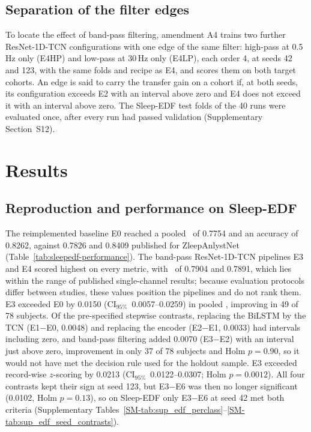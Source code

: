 \documentclass[11pt,a4paper]{article}
\newcommand{\mf}{\text{macro-F1}}
\newcommand{\ci}{\ensuremath{\mathrm{CI}_{95\%}}}
\begin{document}
\subsection{Separation of the filter edges}

To locate the effect of band-pass filtering, amendment A4 trains two further ResNet-1D-TCN
configurations with one edge of the same filter: high-pass at 0.5\,Hz only (E4HP) and low-pass at
30\,Hz only (E4LP), each order 4, at seeds 42 and 123, with the same folds and recipe as E4, and
scores them on both target cohorts. An edge is said to carry the transfer gain on a cohort if, at both
seeds, its configuration exceeds E2 with an interval above zero and E4 does not exceed it with an
interval above zero. The Sleep-EDF test folds of the 40 runs were evaluated once, after every run had
passed validation (Supplementary Section~S12).

\section{Results}

\subsection{Reproduction and performance on Sleep-EDF}

The reimplemented baseline E0 reached a pooled \mf\ of 0.7754 and an accuracy of 0.8262, against
0.7826 and 0.8409 published for ZleepAnlystNet (Table~\ref{tab:sleepedf-performance}). The band-pass
ResNet-1D-TCN pipelines E3 and E4 scored highest on every metric, with \mf\ of 0.7904 and 0.7891,
which lies within the range of published single-channel results; because evaluation protocols differ
between studies, these values position the pipelines and do not rank them. E3 exceeded E0 by 0.0150
(\ci\ 0.0057--0.0259) in pooled \mf, improving in 49 of 78 subjects. Of the pre-specified stepwise
contrasts, replacing the BiLSTM by the TCN (E1$-$E0, 0.0048) and replacing the encoder (E2$-$E1,
0.0033) had intervals including zero, and band-pass filtering added 0.0070 (E3$-$E2) with an
interval just above zero, improvement in only 37 of 78 subjects and Holm $p=0.90$, so it would not
have met the decision rule used for the holdout sample. E3 exceeded record-wise $z$-scoring by 0.0213
(\ci\ 0.0122--0.0307; Holm $p=0.0012$). All four contrasts kept their sign at seed 123, but E3$-$E6
was then no longer significant (0.0102, Holm $p=0.13$), so on Sleep-EDF only E3$-$E6 at seed 42 met
both criteria (Supplementary Tables~\ref{SM-tab:sup_edf_perclass}--\ref{SM-tab:sup_edf_seed_contrasts}).
\end{document}
